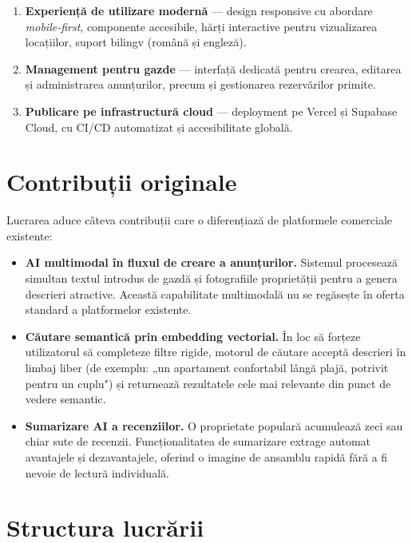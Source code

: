 \documentclass[12pt,a4paper,oneside]{report}
\begin{document}
\begin{enumerate}[leftmargin=2cm]
  \item \textbf{Experiență de utilizare modernă} — design responsive cu abordare \textit{mobile-first}, componente accesibile, hărți interactive pentru vizualizarea locațiilor, suport bilingv (română și engleză).

  \item \textbf{Management pentru gazde} — interfață dedicată pentru crearea, editarea și administrarea anunțurilor, precum și gestionarea rezervărilor primite.

  \item \textbf{Publicare pe infrastructură cloud} — deployment pe Vercel și Supabase Cloud, cu CI/CD automatizat și accesibilitate globală.
\end{enumerate}


\section{Contribuții originale}

Lucrarea aduce câteva contribuții care o diferențiază de platformele comerciale existente:

\begin{itemize}[leftmargin=1.5cm]
  \item \textbf{AI multimodal în fluxul de creare a anunțurilor.} Sistemul procesează simultan textul introdus de gazdă și fotografiile proprietății pentru a genera descrieri atractive. Această capabilitate multimodală nu se regăsește în oferta standard a platformelor existente.

  \item \textbf{Căutare semantică prin embedding vectorial.} În loc să forțeze utilizatorul să completeze filtre rigide, motorul de căutare acceptă descrieri în limbaj liber (de exemplu: „un apartament confortabil lângă plajă, potrivit pentru un cuplu") și returnează rezultatele cele mai relevante din punct de vedere semantic.

  \item \textbf{Sumarizare AI a recenziilor.} O proprietate populară acumulează zeci sau chiar sute de recenzii. Funcționalitatea de sumarizare extrage automat avantajele și dezavantajele, oferind o imagine de ansamblu rapidă fără a fi nevoie de lectură individuală.
\end{itemize}


\section{Structura lucrării}
\end{document}
